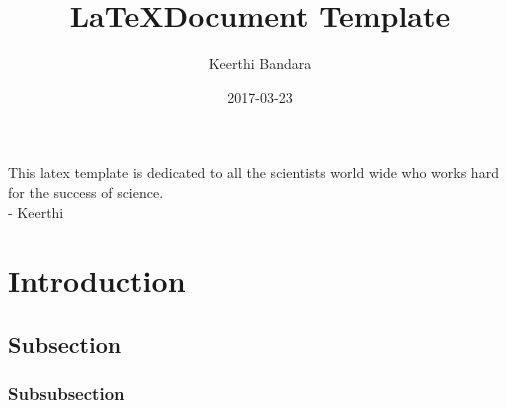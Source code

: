 \documentclass{article}
\title{\LaTeX Document Template}
\date{2017-03-23}
\author{Keerthi Bandara}
\begin{document}
    \maketitle

	\newpage
    \begin{flushright}
    This latex template is dedicated to all the scientists world wide who works hard for the success of science.\\ 
    - Keerthi
    \end{flushright}
    
    \newpage 
	\begin{abstract}
	\blindtext
	\end{abstract}


    \newpage 
	\tableofcontents

	\newpage
	\listoffigures

	\listoftables

    
%
%
	\newpage
    \section{Introduction}
    \lipsum[2-4]
    
        \subsection{Subsection}
        \paragraph{}
        \blindtext

        \subsubsection{Subsubsection}
		\paragraph{}        
        \blindtext
        
        \paragraph{}
        \blindtext 
        
\end{document}
